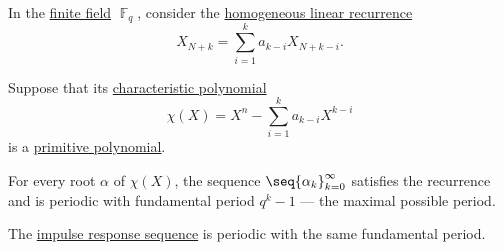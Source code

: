 \begin{theorem}\label{thm:linear_recurrences_with_maximal_period}
  In the \hyperref[def:finite_field]{finite field} \( \BbbF_q \), consider the \hyperref[def:homogeneous_linear_recurrence]{homogeneous linear recurrence}
  \begin{equation*}
    X_{N+k} = \sum_{i=1}^k a_{k-i} X_{N+k-i}.
  \end{equation*}

  Suppose that its \hyperref[def:linear_recurrence_characteristic_polynomial]{characteristic polynomial}
  \begin{equation*}
    \chi(X) = X^n - \sum_{i=1}^k a_{k-i} X^{k-i}
  \end{equation*}
  is a \hyperref[def:finite_field_primitive_polynomial]{primitive polynomial}.

  \begin{thmenum}
     For every root \( \alpha \) of \( \chi(X) \), the sequence \( \seq{ \alpha_k }_{k=0}^\infty \) satisfies the recurrence and is periodic with fundamental period \( q^k - 1 \) --- the maximal possible period.

     The \hyperref[def:recurrence_relation_space]{impulse response sequence} is periodic with the same fundamental period.
  \end{thmenum}
\end{theorem}
